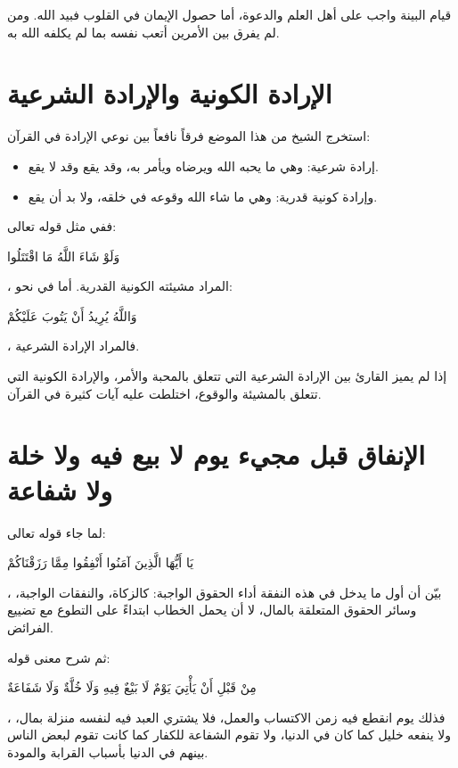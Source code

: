 \begin{fawaid}
قيام البينة واجب على أهل العلم والدعوة، أما حصول الإيمان في القلوب فبيد الله. ومن لم يفرق بين الأمرين أتعب نفسه بما لم يكلفه الله به.
\end{fawaid}

\section{الإرادة الكونية والإرادة الشرعية}
استخرج الشيخ من هذا الموضع فرقاً نافعاً بين نوعي الإرادة في القرآن:
\begin{itemize}
    \item إرادة شرعية: وهي ما يحبه الله ويرضاه ويأمر به، وقد يقع وقد لا يقع.
    \item وإرادة كونية قدرية: وهي ما شاء الله وقوعه في خلقه، ولا بد أن يقع.
\end{itemize}

ففي مثل قوله تعالى: \begin{ayah}وَلَوْ شَاءَ اللَّهُ مَا اقْتَتَلُوا\end{ayah}، المراد مشيئته الكونية القدرية. أما في نحو: \begin{ayah}وَاللَّهُ يُرِيدُ أَنْ يَتُوبَ عَلَيْكُمْ\end{ayah}، فالمراد الإرادة الشرعية.

\begin{fawaid}
إذا لم يميز القارئ بين الإرادة الشرعية التي تتعلق بالمحبة والأمر، والإرادة الكونية التي تتعلق بالمشيئة والوقوع، اختلطت عليه آيات كثيرة في القرآن.
\end{fawaid}

\separator

\section{الإنفاق قبل مجيء يوم لا بيع فيه ولا خلة ولا شفاعة}
لما جاء قوله تعالى: \begin{ayah}يَا أَيُّهَا الَّذِينَ آمَنُوا أَنْفِقُوا مِمَّا رَزَقْنَاكُمْ\end{ayah}، بيّن  أن أول ما يدخل في هذه النفقة أداء الحقوق الواجبة: كالزكاة، والنفقات الواجبة، وسائر الحقوق المتعلقة بالمال، لا أن يحمل الخطاب ابتداءً على التطوع مع تضييع الفرائض.

ثم شرح معنى قوله: \begin{ayah}مِنْ قَبْلِ أَنْ يَأْتِيَ يَوْمٌ لَا بَيْعٌ فِيهِ وَلَا خُلَّةٌ وَلَا شَفَاعَةٌ\end{ayah}، فذلك يوم انقطع فيه زمن الاكتساب والعمل، فلا يشتري العبد فيه لنفسه منزلة بمال، ولا ينفعه خليل كما كان في الدنيا، ولا تقوم الشفاعة للكفار كما كانت تقوم لبعض الناس بينهم في الدنيا بأسباب القرابة والمودة.

